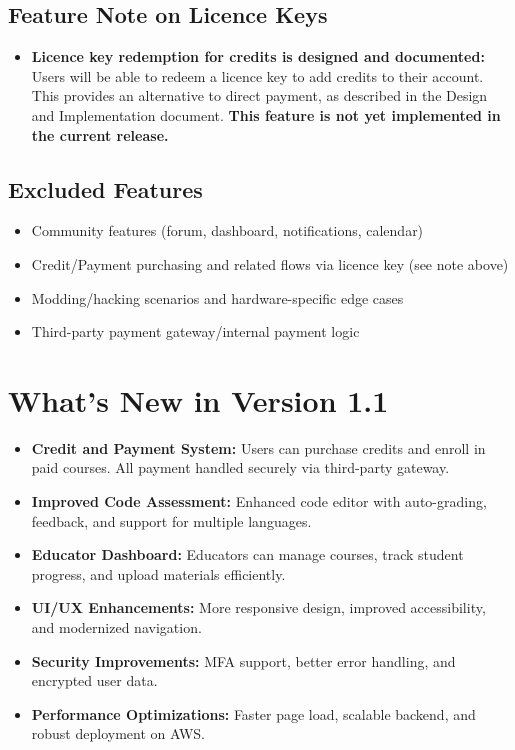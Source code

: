 \documentclass[a4paper,11pt]{scrartcl}
\begin{document}
\subsection{Feature Note on Licence Keys}
\begin{itemize}[leftmargin=*]
    \item \textbf{Licence key redemption for credits is designed and documented:} Users will be able to redeem a licence key to add credits to their account. This provides an alternative to direct payment, as described in the Design and Implementation document. \textbf{This feature is not yet implemented in the current release.}
\end{itemize}

\subsection{Excluded Features}
\begin{itemize}[leftmargin=*]
    \item Community features (forum, dashboard, notifications, calendar)
    \item Credit/Payment purchasing and related flows via licence key (see note above)
    \item Modding/hacking scenarios and hardware-specific edge cases
    \item Third-party payment gateway/internal payment logic
\end{itemize}

\section{What's New in Version 1.1}

\begin{itemize}[leftmargin=*]
    \item \textbf{Credit and Payment System:} Users can purchase credits and enroll in paid courses. All payment handled securely via third-party gateway.
    \item \textbf{Improved Code Assessment:} Enhanced code editor with auto-grading, feedback, and support for multiple languages.
    \item \textbf{Educator Dashboard:} Educators can manage courses, track student progress, and upload materials efficiently.
    \item \textbf{UI/UX Enhancements:} More responsive design, improved accessibility, and modernized navigation.
    \item \textbf{Security Improvements:} MFA support, better error handling, and encrypted user data.
    \item \textbf{Performance Optimizations:} Faster page load, scalable backend, and robust deployment on AWS.
\end{itemize}
\end{document}
